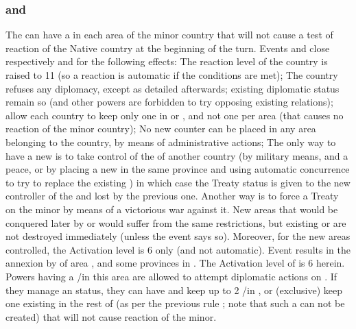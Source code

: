 \subsubsection{ and }\label{chDiplo:Diplo-japon}\label{chDiplo:Diplo-chine}
\aparag The \MAJ can have a \TP in each area of the minor country that
will not cause a test of reaction of the Native country at the beginning
of the turn.
Events  and
 close respectively  and
 for the following effects:
\bparag The reaction level of the country is raised to 11 (so a reaction
is automatic if the conditions are met);
\bparag The country refuses any diplomacy, except as detailed
afterwards; existing diplomatic status remain so (and other powers are
forbidden to try opposing existing relations);
\bparag \dipAT allow each country to keep only one \TP in 
or , and not one per area (that \TP causes no reaction of
the minor country);
\bparag No new \TP counter can be placed in any area belonging to the
country, by means of administrative actions;
\bparag The only way to have a new \TP is to take control of the \TP of
another country (by military means, and a peace, or by placing a new \TP
in the same province and using automatic concurrence to try to replace
the existing \TP) in which case the Treaty status is given to the new
controller of the \TP and lost by the previous one. Another way is to
force a Treaty on the minor by means of a victorious war against it.
\bparag New areas that would be conquered later by  or
 would suffer from the same restrictions, but existing \TP
or \COL are not destroyed immediately (unless the event says so).
Moreover, for the new areas controlled, the Activation level is 6 only
(and not automatic).
Event  results in the annexion by
 of area , and some provinces in
.
\bparag The Activation level of  is 6 herein.
\bparag Powers having a \COL/\TP in this area
are allowed to attempt diplomatic actions on
. If they manage an \dipAT status, they can have and
keep up to 2 \COL/\TP in , or (exclusive) keep one
existing in the rest of  (as per the previous rule ; note
that such a \TP can not be created) that will not cause reaction of the
minor.

